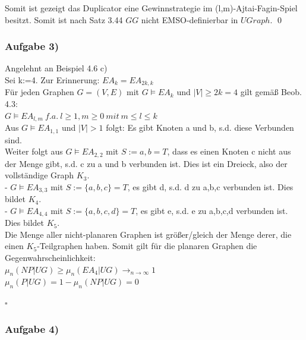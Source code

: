 \documentclass[12pt]{article}
\begin{document}
Somit ist gezeigt das Duplicator eine Gewinnstrategie im (l,m)-Ajtai-Fagin-Spiel
besitzt. Somit ist nach Satz 3.44 $GG$ nicht EMSO-definierbar in $UGraph$. \qed

\subsubsection*{Aufgabe 3)}

Angelehnt an Beispiel 4.6 c)\\
Sei k:=4. Zur Erinnerung: $EA_k = EA_{2k,k}$\\
Für jeden Graphen $G=(V,E)$ mit $G \models EA_k$ und $|V| \geq 2k = 4$ gilt gemäß Beob. 4.3:\\
$G \models EA_{l,m}\ f.a.\ l\geq 1, m\geq 0\ mit\ m\leq l \leq k$\\
Aus $G \models EA_{1,1}$ und $|V| > 1$ folgt: Es gibt Knoten a und b, s.d. diese Verbunden sind.\\
Weiter folgt aus $G \models EA_{2,2}$ mit $S:={a,b}=T$, dass es einen Knoten c nicht aus der Menge gibt, s.d. c zu a und b verbunden ist. Dies ist ein Dreieck, also der vollständige Graph $K_3$.   \\
- $G \models EA_{3,3}$ mit $S:=\{a,b,c\}=T$, es gibt d, s.d. d zu a,b,c verbunden ist. Dies bildet $K_4$. \\
- $G \models EA_{4,4}$ mit $S:=\{a,b,c,d\}=T$, es gibt e, s.d. e zu a,b,c,d verbunden ist. Dies bildet $K_5$. \\

Die Menge aller nicht-planaren Graphen ist größer/gleich der Menge derer, die einen $K_5$-Teilgraphen haben.
Somit gilt für die planaren Graphen die Gegenwahrscheinlichkeit:\\
$\mu_n(NP | UG) \geq  \mu_n(EA_4 | UG) \rightarrow_{n \rightarrow \infty} 1$\\
$\mu_n(P | UG) = 1 - \mu_n(NP | UG) = 0$
\begin{flushright}
$\square$
\end{flushright}

\subsubsection*{Aufgabe 4)}
\end{document}
